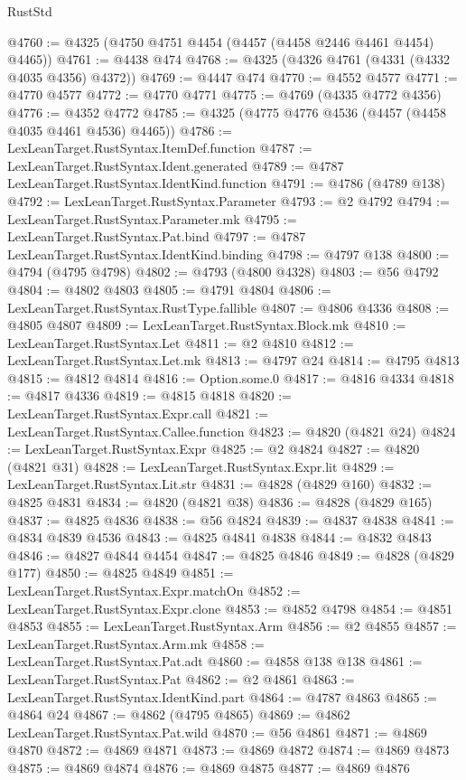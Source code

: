 \begin{lexlean}{RustStd}
\begin{coremodule}
@4760 := @4325 (@4750 @4751 @4454 (@4457 (@4458 @2446 @4461 @4454) @4465))
@4761 := @4438 @474
@4768 := @4325 (@4326 @4761 (@4331 (@4332 @4035 @4356) @4372))
@4769 := @4447 @474
@4770 := @4552 @4577
@4771 := @4770 @4577
@4772 := @4770 @4771
@4775 := @4769 (@4335 @4772 @4356)
@4776 := @4352 @4772
@4785 := @4325 (@4775 @4776 @4536 (@4457 (@4458 @4035 @4461 @4536) @4465))
@4786 := LexLeanTarget.RustSyntax.ItemDef.function
@4787 := LexLeanTarget.RustSyntax.Ident.generated
@4789 := @4787 LexLeanTarget.RustSyntax.IdentKind.function
@4791 := @4786 (@4789 @138)
@4792 := LexLeanTarget.RustSyntax.Parameter
@4793 := @2 @4792
@4794 := LexLeanTarget.RustSyntax.Parameter.mk
@4795 := LexLeanTarget.RustSyntax.Pat.bind
@4797 := @4787 LexLeanTarget.RustSyntax.IdentKind.binding
@4798 := @4797 @138
@4800 := @4794 (@4795 @4798)
@4802 := @4793 (@4800 @4328)
@4803 := @56 @4792
@4804 := @4802 @4803
@4805 := @4791 @4804
@4806 := LexLeanTarget.RustSyntax.RustType.fallible
@4807 := @4806 @4336
@4808 := @4805 @4807
@4809 := LexLeanTarget.RustSyntax.Block.mk
@4810 := LexLeanTarget.RustSyntax.Let
@4811 := @2 @4810
@4812 := LexLeanTarget.RustSyntax.Let.mk
@4813 := @4797 @24
@4814 := @4795 @4813
@4815 := @4812 @4814
@4816 := Option.some.{0}
@4817 := @4816 @4334
@4818 := @4817 @4336
@4819 := @4815 @4818
@4820 := LexLeanTarget.RustSyntax.Expr.call
@4821 := LexLeanTarget.RustSyntax.Callee.function
@4823 := @4820 (@4821 @24)
@4824 := LexLeanTarget.RustSyntax.Expr
@4825 := @2 @4824
@4827 := @4820 (@4821 @31)
@4828 := LexLeanTarget.RustSyntax.Expr.lit
@4829 := LexLeanTarget.RustSyntax.Lit.str
@4831 := @4828 (@4829 @160)
@4832 := @4825 @4831
@4834 := @4820 (@4821 @38)
@4836 := @4828 (@4829 @165)
@4837 := @4825 @4836
@4838 := @56 @4824
@4839 := @4837 @4838
@4841 := @4834 @4839 @4536
@4843 := @4825 @4841 @4838
@4844 := @4832 @4843
@4846 := @4827 @4844 @4454
@4847 := @4825 @4846
@4849 := @4828 (@4829 @177)
@4850 := @4825 @4849
@4851 := LexLeanTarget.RustSyntax.Expr.matchOn
@4852 := LexLeanTarget.RustSyntax.Expr.clone
@4853 := @4852 @4798
@4854 := @4851 @4853
@4855 := LexLeanTarget.RustSyntax.Arm
@4856 := @2 @4855
@4857 := LexLeanTarget.RustSyntax.Arm.mk
@4858 := LexLeanTarget.RustSyntax.Pat.adt
@4860 := @4858 @138 @138
@4861 := LexLeanTarget.RustSyntax.Pat
@4862 := @2 @4861
@4863 := LexLeanTarget.RustSyntax.IdentKind.part
@4864 := @4787 @4863
@4865 := @4864 @24
@4867 := @4862 (@4795 @4865)
@4869 := @4862 LexLeanTarget.RustSyntax.Pat.wild
@4870 := @56 @4861
@4871 := @4869 @4870
@4872 := @4869 @4871
@4873 := @4869 @4872
@4874 := @4869 @4873
@4875 := @4869 @4874
@4876 := @4869 @4875
@4877 := @4869 @4876

\end{coremodule}
\end{lexlean}
